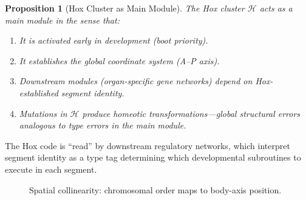 \documentclass[12pt,a4paper]{article}
\newtheorem{proposition}[theorem]{Proposition}
\begin{document}
\begin{proposition}[Hox Cluster as Main Module]\label{prop:hox-main}
The Hox cluster $\mathcal{H}$ acts as a main module in the sense
that:
\begin{enumerate}
  \item It is activated early in development (boot priority).
  \item It establishes the global coordinate system (A--P axis).
  \item Downstream modules (organ-specific gene networks) depend
    on Hox-established segment identity.
  \item Mutations in $\mathcal{H}$ produce \emph{homeotic
    transformations}---global structural errors analogous to
    type errors in the main module.
\end{enumerate}
\end{proposition}

The Hox code is ``read'' by downstream regulatory networks, which
interpret segment identity as a type tag determining which
developmental subroutines to execute in each segment.

\begin{figure}[H]
\centering
{}
\caption{Spatial collinearity: chromosomal order maps to body-axis position.}
\label{fig:collinearity}
\end{figure}
\end{document}

